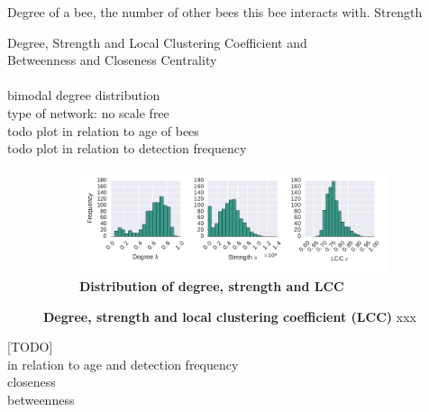 

Degree of a bee, the number of other bees this bee interacts with.
Strength


Degree, Strength and Local Clustering Coefficient and \\
Betweenness and Closeness Centrality\\
\\
bimodal degree distribution\\
type of network: no scale free\\
todo plot in relation to age of bees\\
todo plot in relation to detection frequency\\

\begin{figure}[!htb]
	\centering
	\begin{subfigure}[b]{1.0\textwidth}
	\centering
	\includegraphics[width=1.0\textwidth]{Figures/n3-stat-degreeStrLCC}
	\caption[Distribution of degree, strength and LCC]{\textbf{Distribution of degree, strength and LCC}}
	\label{fig:n3-d-s-cc}
	\end{subfigure}
	\caption[Degree, strength and local clustering coefficient (LCC)]{\textbf{Degree, strength and local clustering coefficient (LCC)} xxx}
	\label{fig:n3-degreeStrLCC}
\end{figure}

[TODO]\\
in relation to age and detection frequency\\
closeness\\
betweenness\\